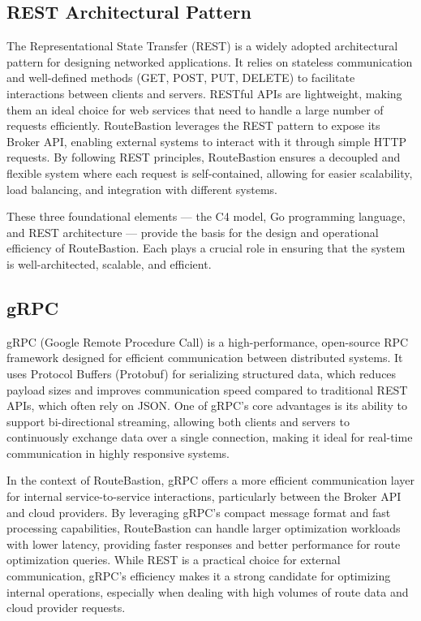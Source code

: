 \documentclass[english,notblind]{sbc20}
\begin{document}
\subsection{REST Architectural Pattern}
\label{subsec:rest}
The Representational State Transfer (REST) is a widely adopted architectural pattern for designing networked applications. It relies on stateless communication and well-defined methods (GET, POST, PUT, DELETE) to facilitate interactions between clients and servers. RESTful APIs are lightweight, making them an ideal choice for web services that need to handle a large number of requests efficiently. RouteBastion leverages the REST pattern to expose its Broker API, enabling external systems to interact with it through simple HTTP requests. By following REST principles, RouteBastion ensures a decoupled and flexible system where each request is self-contained, allowing for easier scalability, load balancing, and integration with different systems.

These three foundational elements — the C4 model, Go programming language, and REST architecture — provide the basis for the design and operational efficiency of RouteBastion. Each plays a crucial role in ensuring that the system is well-architected, scalable, and efficient.

\subsection{gRPC}
\label{subsec:grpc}
gRPC (Google Remote Procedure Call) is a high-performance, open-source RPC framework designed for efficient communication between distributed systems. It uses Protocol Buffers (Protobuf) for serializing structured data, which reduces payload sizes and improves communication speed compared to traditional REST APIs, which often rely on JSON. One of gRPC's core advantages is its ability to support bi-directional streaming, allowing both clients and servers to continuously exchange data over a single connection, making it ideal for real-time communication in highly responsive systems.

In the context of RouteBastion, gRPC offers a more efficient communication layer for internal service-to-service interactions, particularly between the Broker API and cloud providers. By leveraging gRPC's compact message format and fast processing capabilities, RouteBastion can handle larger optimization workloads with lower latency, providing faster responses and better performance for route optimization queries. While REST is a practical choice for external communication, gRPC's efficiency makes it a strong candidate for optimizing internal operations, especially when dealing with high volumes of route data and cloud provider requests.
\end{document}
